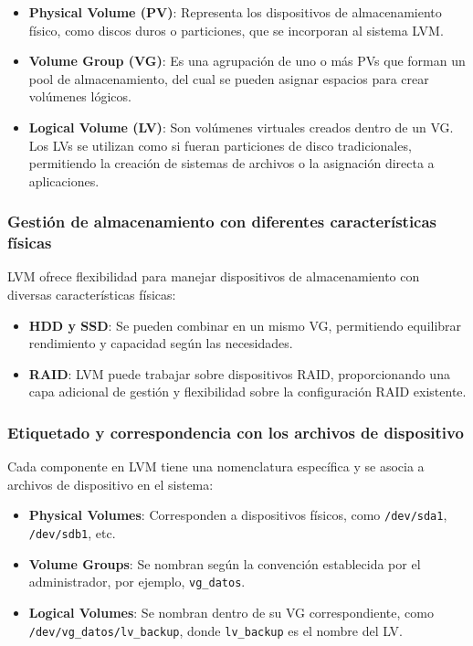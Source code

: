 \begin{itemize}
  \item \textbf{Physical Volume (PV)}: Representa los dispositivos de almacenamiento físico, como discos duros o particiones, que se incorporan al sistema LVM.
  \item \textbf{Volume Group (VG)}: Es una agrupación de uno o más PVs que forman un pool de almacenamiento, del cual se pueden asignar espacios para crear volúmenes lógicos.
  \item \textbf{Logical Volume (LV)}: Son volúmenes virtuales creados dentro de un VG. Los LVs se utilizan como si fueran particiones de disco tradicionales, permitiendo la creación de sistemas de archivos o la asignación directa a aplicaciones.
\end{itemize}

\subsubsection{Gestión de almacenamiento con diferentes características físicas}

LVM ofrece flexibilidad para manejar dispositivos de almacenamiento con diversas características físicas:

\begin{itemize}
  \item \textbf{HDD y SSD}: Se pueden combinar en un mismo VG, permitiendo equilibrar rendimiento y capacidad según las necesidades.
  \item \textbf{RAID}: LVM puede trabajar sobre dispositivos RAID, proporcionando una capa adicional de gestión y flexibilidad sobre la configuración RAID existente.
\end{itemize}

\subsubsection{Etiquetado y correspondencia con los archivos de dispositivo}

Cada componente en LVM tiene una nomenclatura específica y se asocia a archivos de dispositivo en el sistema:

\begin{itemize}
  \item \textbf{Physical Volumes}: Corresponden a dispositivos físicos, como \texttt{/dev/sda1}, \texttt{/dev/sdb1}, etc.
  \item \textbf{Volume Groups}: Se nombran según la convención establecida por el administrador, por ejemplo, \texttt{vg\_datos}.
  \item \textbf{Logical Volumes}: Se nombran dentro de su VG correspondiente, como \texttt{/dev/vg\_datos/lv\_backup}, donde \texttt{lv\_backup} es el nombre del LV.
\end{itemize}

